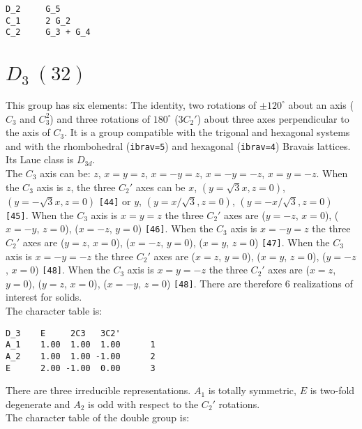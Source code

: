 \documentclass[12pt,a4paper,twoside]{report}
\begin{document}
\begin{tcolorbox}
\begin{footnotesize}
\begin{verbatim}
D_2     G_5  
C_1     2 G_2
C_2     G_3 + G_4
\end{verbatim}
\end{footnotesize}
\end{tcolorbox}


\newpage
{\color{coral}\section{$D_3\ (32)$}}
\color{black}
This group has six elements: The identity, two rotations of $\pm120^\circ$ about
an axis ($C_3$ and $C_3^2$) and three rotations of $180^\circ$ 
($3C_2'$) about three axes perpendicular to the axis of $C_3$.
It is a group compatible with the trigonal and hexagonal systems and with the
rhombohedral (\texttt{ibrav=5}) and hexagonal (\texttt{ibrav=4})
Bravais lattices. \\ 
Its Laue class is $D_{3d}$. \\
The $C_3$ axis can be: $z$, $x=y=z$, $x=-y=z$, $x=-y=-z$, $x=y=-z$.
When the $C_3$ axis is $z$, the three $C_2'$ axes can be
$x$, $(y=\sqrt{3}x, z=0)$, $(y=-\sqrt{3}x, z=0)$ \texttt{[44]} or 
$y$, $(y=x/\sqrt{3}, z=0)$, $(y=-x/\sqrt{3}, z=0)$ \texttt{[45]}. 
When the $C_3$ axis is $x=y=z$ the three $C_2'$ axes are
($y=-z$, $x=0$), ($x=-y$, $z=0$), ($x=-z$, $y=0$) \texttt{[46]}.
When the $C_3$ axis is $x=-y=z$ the three $C_2'$ axes are
($y=z$, $x=0$), ($x=-z$, $y=0$), ($x=y$, $z=0$) \texttt{[47]}.
When the $C_3$ axis is $x=-y=-z$ the three $C_2'$ axes are
($x=z$, $y=0$), ($x=y$, $z=0$), ($y=-z$, $x=0$) \texttt{[48]}.
When the $C_3$ axis is $x=y=-z$ the three $C_2'$ axes are
($x=z$, $y=0$), ($y=z$, $x=0$), ($x=-y$, $z=0$) \texttt{[48]}. 
There are therefore $6$ realizations of interest for solids. \\
The character table is:

\begin{tcolorbox}
\begin{footnotesize}
\begin{verbatim}
D_3    E     2C3   3C2'
A_1    1.00  1.00  1.00      1
A_2    1.00  1.00 -1.00      2
E      2.00 -1.00  0.00      3
\end{verbatim}
\end{footnotesize}
\end{tcolorbox}

There are three irreducible representations. $A_1$ is totally symmetric,
$E$ is two-fold degenerate and $A_2$ is odd with respect to the
$C_2'$ rotations.\\
The character table of the double group is:
\end{document}
